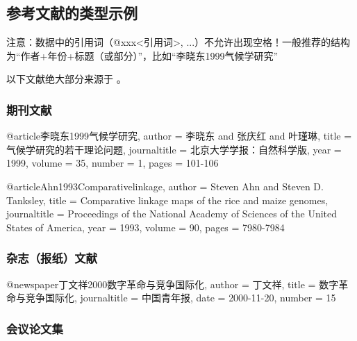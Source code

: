 
\subsection{参考文献的类型示例} \label{subsec:参考文献的类型示例}

注意：数据中的引用词（@xxx{<引用词>, ...}）不允许出现空格！一般推荐的结构为“作者+年份+标题（或部分）”，比如“李晓东1999气候学研究”

以下文献绝大部分来源于 \parencite{本科生院毕业论文注释与参考文献著录格式}。

\subsubsection{期刊文献}

\begin{latexexample}
  @article{李晓东1999气候学研究,
    author          = {李晓东 and 张庆红 and 叶瑾琳},
    title           = {气候学研究的若干理论问题},
    journaltitle    = {北京大学学报：自然科学版},
    year            = {1999},
    volume          = {35},
    number          = {1},
    pages           = {101-106}
  }

  @article{Ahn1993Comparativelinkage,
    author          = {Steven Ahn and Steven D. Tanksley},
    title           = {Comparative linkage maps of the rice and maize genomes},
    journaltitle    = {Proceedings of the National Academy of Sciences of the United States of America},
    year            = {1993},
    volume          = {90},
    pages           = {7980-7984}
  }
\end{latexexample}


\subsubsection{杂志（报纸）文献}

\begin{latexexample}
  @newspaper{丁文祥2000数字革命与竞争国际化,
    author          = {丁文祥},
    title           = {数字革命与竞争国际化},
    journaltitle    = {中国青年报},
    date            = {2000-11-20},
    number          = {15}
  }
\end{latexexample}


\subsubsection{会议论文集}

